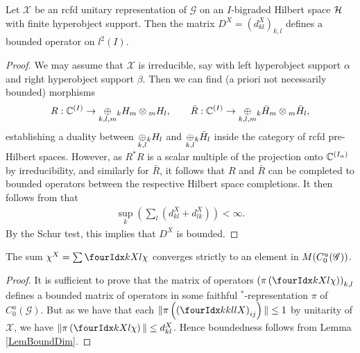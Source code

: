  \begin{Lem} \label{LemBoundDim} Let $\mathscr{X}$ be an rcfd unitary
   representation of $\mathscr{G}$ on an $I$-bigraded Hilbert space $\Hsp$ with finite hyperobject support. Then the matrix $D^X = (d^X_{kl})_{k,l}$ defines a bounded operator on $l^2(I)$. 
  \end{Lem}
  \begin{proof} We may assume that $\mathscr{X}$ is irreducible, say
    with left hyperobject support $\alpha$ and right hyperobject support
    $\beta$. Then we can find (a priori not necessarily bounded)
    morphisms \[R: \C^{(I)}\rightarrow \underset{k,l,m}{\oplus} \GrDA{H}{k}{m}\otimes
    \GrDA{H}{m}{l},\qquad \bar{R}: \C^{(I)} \rightarrow \underset{k,l,m}{\oplus}
    \GrDA{\bar{H}}{k}{m}\otimes \GrDA{\bar{H}}{m}{l},\] establishing a
    duality between $\underset{k,l}{\oplus} \GrDA{H}{k}{l}$ and
    $\underset{k,l}{\oplus}\GrDA{\bar{H}}{k}{l}$ inside the category of
    rcfd pre-Hilbert spaces. However, as $R^*R$ is a scalar multiple
    of the projection onto $\C^{(I_{\alpha})}$ by irreducibility, and
    similarly for $\bar{R}$, it follows that $R$ and $\bar{R}$ can be
    completed to bounded operators between the respective Hilbert
    space completions. It then follows from \cite[Lemma A.3.2]{DCY1}
    that 
    \begin{align} \label{eq:dim-estimate}
  \sup_k (\sum_l (d_{kl}^X+d_{lk}^X)) < \infty.    
    \end{align}
 By the Schur test,
    this implies that $D^X$ is bounded.
\end{proof} 


   
\begin{Lem} The sum $\chi^X  =\sum \Gr{\chi}{}{X}{k}{l}$ converges strictly to an element in $M(\CuG)$. 
\end{Lem} 
 
\begin{proof} It is sufficient to prove that the matrix of operators $\left(\pi\left(\Gr{\chi}{}{X}{k}{l}\right)\right)_{k,l}$ defines a bounded matrix of operators in some faithful $^*$-representation $\pi$ of $C^{u}_{0}(\mathscr{G})$. But as we have that each $\|\pi\left(\left(\Gr{X}{k}{l}{k}{l}\right)_{ij}\right)\|\leq 1$ by unitarity of $\mathscr{X}$, we have $\| \pi\left(\Gr{\chi}{}{X}{k}{l}\right)\| \leq d^X_{kl}$.  Hence boundedness follows from Lemma \ref{LemBoundDim}.
\end{proof} 

